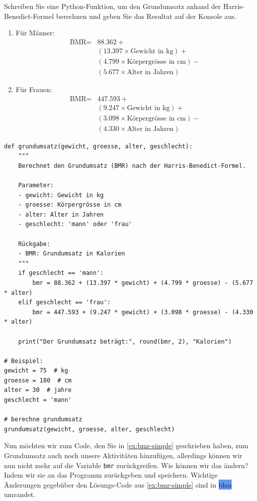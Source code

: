 \begin{mysubmission}\label{ex:bmr-simple}
Schreiben Sie eine Python-Funktion, um den Grundumsatz anhand der Harris-Benedict-Formel berechnen und geben Sie das Resultat auf der Konsole aus.
\begin{enumerate}
\item Für Männer:
\begin{align*}
\text{BMR} = & 88.362 +\\ 
& (13.397 \times \text{Gewicht in kg}) +\\ 
& (4.799 \times \text{Körpergrösse in cm}) -\\
& (5.677 \times \text{Alter in Jahren})
\end{align*}
\item Für Frauen:
\begin{align*}
\text{BMR} = & 447.593  +\\ 
& (9.247 \times \text{Gewicht in kg}) +\\ 
& (3.098 \times \text{Körpergrösse in cm}) -\\
& (4.330 \times \text{Alter in Jahren})
\end{align*}
\end{enumerate}
\begin{myanswer}
\begin{lstlisting}
def grundumsatz(gewicht, groesse, alter, geschlecht):
    """
    Berechnet den Grundumsatz (BMR) nach der Harris-Benedict-Formel.
    
    Parameter:
    - gewicht: Gewicht in kg
    - groesse: Körpergrösse in cm
    - alter: Alter in Jahren
    - geschlecht: 'mann' oder 'frau'
    
    Rückgabe:
    - BMR: Grundumsatz in Kalorien
    """
    if geschlecht == 'mann':
        bmr = 88.362 + (13.397 * gewicht) + (4.799 * groesse) - (5.677 * alter)
    elif geschlecht == 'frau':
        bmr = 447.593 + (9.247 * gewicht) + (3.098 * groesse) - (4.330 * alter)
    
    print("Der Grundumsatz beträgt:", round(bmr, 2), "Kalorien")

# Beispiel:
gewicht = 75  # kg
groesse = 180  # cm
alter = 30  # jahre
geschlecht = 'mann'

# berechne grundumsatz
grundumsatz(gewicht, groesse, alter, geschlecht)
\end{lstlisting}
\end{myanswer}
\end{mysubmission}

Nun möchten wir zum Code, den Sie in \cref{ex:bmr-simple} geschrieben haben, zum Grundumsatz auch noch unsere Aktivitäten hinzufügen, allerdings können wir nun nicht mehr auf die Variable \texttt{bmr} zurückgreifen. Wie können wir das ändern? Indem wir sie an das Programm zurückgeben und speichern. Wichtige Änderungen gegebüber den Lösungs-Code aus \cref{ex:bmr-simple} sind in \colorbox{CornflowerBlue}{blau} umrandet.

